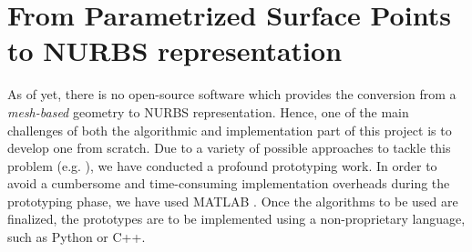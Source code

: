 \section{From Parametrized Surface Points to NURBS representation}
As of yet, there is no open-source software which provides the conversion from a \textit{mesh-based} geometry to NURBS representation. Hence, one of the main challenges of both the algorithmic and implementation part of this project is to develop one from scratch. Due to a variety of possible approaches to tackle this problem (e.g. \cite{ eck1996automatic, becker2011advanced}), we have conducted a profound prototyping work. In order to avoid a  cumbersome and time-consuming implementation overheads during the prototyping phase, we have used MATLAB \cite{MATLAB}. Once the algorithms to be used are finalized, the prototypes are to be implemented using a non-proprietary language, such as Python or C++.




